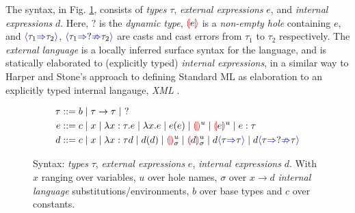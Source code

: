 \par The syntax, in Fig. \ref{fig:syntax}, consists of \textit{types} $\tau$, \textit{external expressions} $e$, and \textit{internal expressions} $d$. Here, $?$ is the \textit{dynamic type}, $\hole[e]$ is a \textit{non-empty hole} containing $e$, and $\scast{\tau_1}{\tau_2}$,  $\scasterror{\tau_1}{\tau_2}$ are casts and cast errors from $\tau_1$ to $\tau_2$ respectively.
The \textit{external language} is a locally inferred \cite{LocalInference} surface syntax for the language, and is statically elaborated to (explicitly typed) \textit{internal expressions}, in a similar way to Harper and Stone's \cite{StandardMLTypeTheory} approach to defining Standard ML as elaboration to an explicitly typed internal langauge, \textit{XML} \cite{CoreXML}.
\begin{figure}[h]
\begin{align*}
\tau &::= b \mid \tau \to \tau \mid\  ?\\
e &::= c \mid x \mid \lambda x : \tau.e \mid \lambda x. e \mid e(e) \mid \hole^u \mid \hole[e]^u \mid e : \tau\\
d &::= c \mid x \mid \lambda x : \tau d \mid d(d) \mid \hole^u_\sigma \mid \hole[d]^u_\sigma \mid d\scast{\tau}{\tau} \mid d\scasterror{\tau}{\tau}
\end{align*}
\caption{Syntax: \textit{types} $\tau$, \textit{external expressions} $e$, \textit{internal expressions} $d$. With $x$ ranging over variables, $u$ over hole names, $\sigma$ over $x \to d$ \textit{internal language} substitutions/environments, $b$ over base types and $c$ over constants.}
\label{fig:syntax}
\end{figure}

